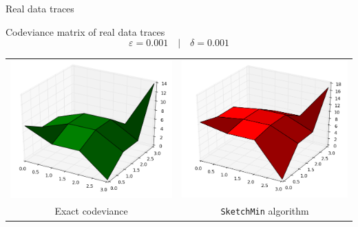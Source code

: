 \documentclass[mathserif]{beamer}
\begin{document}
	\begin{frame}{Real data traces}
		
	\begin{center}
		\begin{block}{Codeviance matrix of real data traces}
		\[ \varepsilon = 0.001 \quad \vert \quad \delta = 0.001 \]
		\end{block}
		\begin{tabular}{cc}
			\includegraphics[scale=0.26]{realtests_real1.png} &
			\includegraphics[scale=0.26]{realtests_sketchmin1.png} \\
			Exact codeviance & \texttt{SketchMin} algorithm \\
		\end{tabular}
	\end{center}
		
	\end{frame}
	
\end{document}
